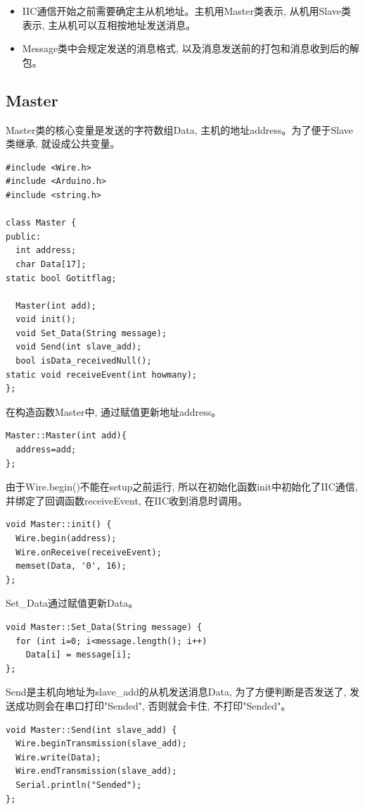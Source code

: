 \documentclass{article}
\begin{document}
\begin{itemize}
  \item IIC通信开始之前需要确定主从机地址。主机用Master类表示, 从机用Slave类表示, 主从机可以互相按地址发送消息。
  \item Message类中会规定发送的消息格式, 以及消息发送前的打包和消息收到后的解包。
\end{itemize} 

\subsection{Master}
Master类的核心变量是发送的字符数组Data, 主机的地址address。为了便于Slave类继承, 就设成公共变量。
\begin{lstlisting}
#include <Wire.h>
#include <Arduino.h>
#include <string.h>

class Master {
public:
  int address;
  char Data[17];
static bool Gotitflag;

  Master(int add);
  void init();
  void Set_Data(String message);
  void Send(int slave_add);
  bool isData_receivedNull();
static void receiveEvent(int howmany);
};
\end{lstlisting}

在构造函数Master中, 通过赋值更新地址address。
\begin{lstlisting}
Master::Master(int add){
  address=add;
};
\end{lstlisting}

由于Wire.begin()不能在setup之前运行, 所以在初始化函数init中初始化了IIC通信, 并绑定了回调函数receiveEvent, 在IIC收到消息时调用。
\begin{lstlisting}
void Master::init() {
  Wire.begin(address);
  Wire.onReceive(receiveEvent);
  memset(Data, '0', 16);
};  
\end{lstlisting}

Set\_Data通过赋值更新Data。
\begin{lstlisting}
void Master::Set_Data(String message) {
  for (int i=0; i<message.length(); i++)
    Data[i] = message[i];
};  
\end{lstlisting}

Send是主机向地址为slave\_add的从机发送消息Data, 为了方便判断是否发送了, 发送成功则会在串口打印"Sended", 否则就会卡住, 不打印"Sended"。 
\begin{lstlisting}
void Master::Send(int slave_add) {
  Wire.beginTransmission(slave_add);
  Wire.write(Data);
  Wire.endTransmission(slave_add);
  Serial.println("Sended");
};
\end{lstlisting}
\end{document}
